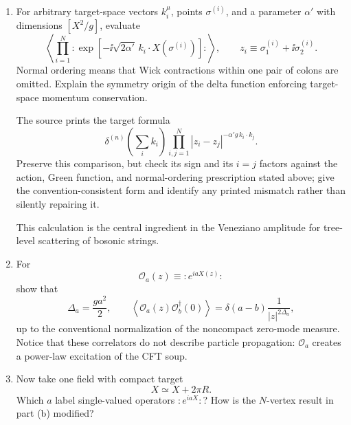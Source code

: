 \begin{enumerate}
\begin{enumerate}
    \item[(b)]
    For arbitrary target-space vectors \(k_i^\mu\), points
    \(\sigma^{(i)}\), and a parameter \(\alpha'\) with dimensions
    \([X^2/g]\), evaluate
    \[
      \left\langle
        \prod_{i=1}^{N}
        :\!\exp\!\left[-\ii\sqrt{2\alpha'}\,
          k_i\mathbin{\cdot}X(\sigma^{(i)})\right]\!:
      \right\rangle ,
      \qquad
      z_i\equiv\sigma^{(i)}_1+\ii\sigma^{(i)}_2 .
    \]
    Normal ordering means that Wick contractions within one pair of
    colons are omitted.  Explain the symmetry origin of the delta
    function enforcing target-space momentum conservation.

    The source prints the target formula
    \[
      \delta^{(n)}\!\left(\sum_i k_i\right)
      \prod_{i,j=1}^{N}
        |z_i-z_j|^{-\alpha' g\,k_i\cdot k_j}.
      \tag{20.4.1}
    \]
    Preserve this comparison, but check its sign and its \(i=j\) factors
    against the action, Green function, and normal-ordering prescription
    stated above; give the convention-consistent form and identify any
    printed mismatch rather than silently repairing it.

    This calculation is the central ingredient in the Veneziano
    amplitude for tree-level scattering of bosonic strings.

    \item[(c)]
    For
    \[
      \mathcal O_a(z)\equiv:\!e^{iaX(z)}\!:
    \]
    show that
    \[
      \Delta_a=\frac{ga^2}{2},\qquad
      \left\langle\mathcal O_a(z)\mathcal O_b^\dagger(0)\right\rangle
        =\delta(a-b)\frac{1}{|z|^{2\Delta_a}},
    \]
    up to the conventional normalization of the noncompact zero-mode
    measure.  Notice that these correlators do not describe particle
    propagation: \(\mathcal O_a\) creates a power-law excitation of the
    CFT soup.

    \item[(d)]
    Now take one field with compact target
    \[
      X\simeq X+2\pi R .
    \]
    Which \(a\) label single-valued operators
    \(:\!e^{iaX}\!:\)?  How is the \(N\)-vertex result in part (b)
    modified?
  \end{enumerate}


\end{enumerate}
